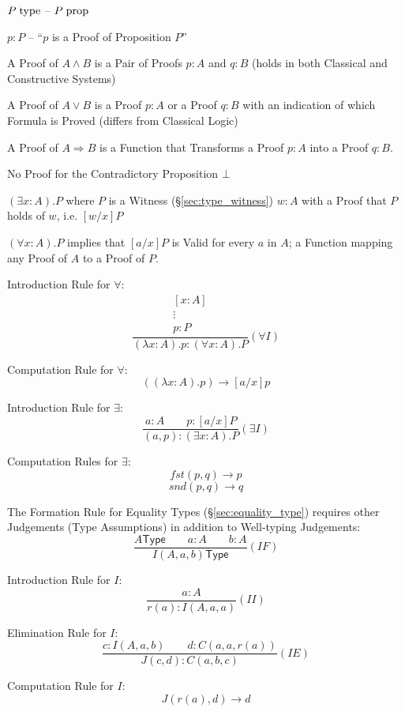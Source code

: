 \asterism


$P\;\mathrm{type}$ -- $P\;\mathrm{prop}$

$p : P$ -- ``$p$ is a Proof of Proposition $P$''

A Proof of $A \wedge B$ is a Pair of Proofs $p : A$ and $q : B$ (holds
in both Classical and Constructive Systems)

A Proof of $A \vee B$ is a Proof $p : A$ or a Proof $q : B$ with an
indication of which Formula is Proved (differs from Classical Logic)

A Proof of $A \Rightarrow B$ is a Function that Transforms a Proof $p
: A$ into a Proof $q : B$.

No Proof for the Contradictory Proposition $\bot$

$(\exists x : A).P$ where $P$ is a Witness (\S\ref{sec:type_witness})
$w : A$ with a Proof that $P$ holds of $w$, i.e. $[w/x]P$

$(\forall x : A).P$ implies that $[a/x]P$ is Valid for every $a$ in
$A$; a Function mapping any Proof of $A$ to a Proof of $P$.

Introduction Rule for $\forall$:
\[
  {
    \frac{
      \begin{matrix}
        [x : A]\\
        \vdots\\
        p : P
      \end{matrix}
    }{
      (\lambda x : A).p : (\forall x : A).P
    }
  } (\forall I)
\]

Computation Rule for $\forall$:
\[
  ((\lambda x : A).p) \rightarrow [a/x]p
\]

Introduction Rule for $\exists$:
\[
  {
    \frac{
      a : A \quad\quad p : [a/x]P
    }{
      (a,p) : (\exists x : A).P
    }
  } (\exists I)
\]

Computation Rules for $\exists$:
\[
  fst (p,q) \rightarrow p
\]\[
  snd (p,q) \rightarrow q
\]

The Formation Rule for Equality Types (\S\ref{sec:equality_type})
requires other Judgements (Type Assumptions) in addition to
Well-typing Judgements:
\[
  {
    \frac{ A \mathsf{ Type} \quad\quad a : A \quad\quad b:A }
    { I (A,a,b) \mathsf{ Type}}
  } (I F)
\]

Introduction Rule for $I$:
\[
  {
    \frac{ a : A }
    { r(a) : I(A,a,a)}
  } (II)
\]

Elimination Rule for $I$:
\[
  {
    \frac{ c : I (A, a, b) \quad\quad d : C(a,a,r(a)) }
    { J(c,d) : C(a,b,c) }
  } (I E)
\]

Computation Rule for $I$:
\[
  J (r(a), d) \rightarrow d
\]

